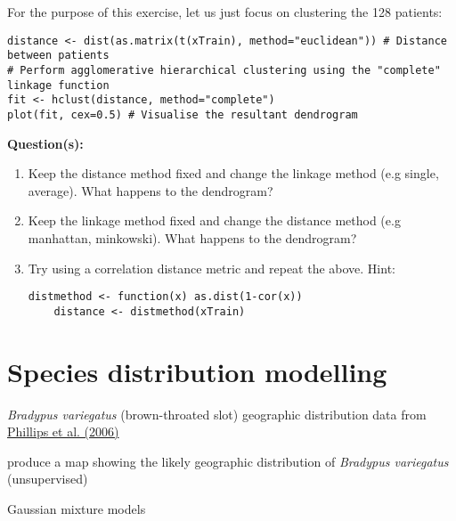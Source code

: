 \documentclass[a4paper,11pt]{article}
\begin{document}
For the purpose of this exercise, let us just focus on clustering the 128 patients:
\\
\begin{lstlisting}[style=RCode]
distance <- dist(as.matrix(t(xTrain), method="euclidean")) # Distance between patients
# Perform agglomerative hierarchical clustering using the "complete" linkage function
fit <- hclust(distance, method="complete") 
plot(fit, cex=0.5) # Visualise the resultant dendrogram 
\end{lstlisting}

\begin{framed}
\textbf{Question(s):}
\begin{enumerate}
	\item Keep the distance method fixed and change the linkage method (e.g single, average). What happens to the dendrogram? 
	\item Keep the linkage method fixed and change the distance method (e.g manhattan, minkowski). What happens to the dendrogram?
	\item Try using a correlation distance metric and repeat the above. Hint:
	\begin{lstlisting}[style=RCode, backgroundcolor=\color{white}]
	distmethod <- function(x) as.dist(1-cor(x))
	distance <- distmethod(xTrain)
	\end{lstlisting}
	\vspace{-0.5cm} %
\end{enumerate}
\end{framed}

\clearpage
\section{Species distribution modelling}
\begin{framed}
\begin{description}[leftmargin=5em,style=nextline]\addtolength{\itemsep}{-0.2\baselineskip}
	\item[Data:] \textit{Bradypus variegatus} (brown-throated slot) geographic distribution data from \href{http://www.cs.princeton.edu/~schapire/maxent/}{Phillips et al. (2006)}	
	\item[Task:] produce a map showing the likely geographic distribution of \textit{Bradypus variegatus} (unsupervised)
	\item[Method:] Gaussian mixture models
\end{description} 
\end{framed}
\end{document}
